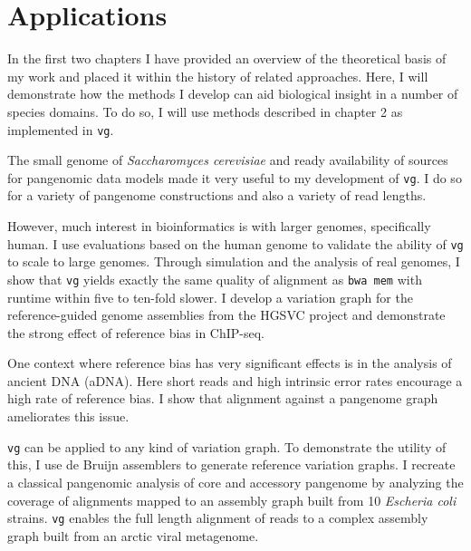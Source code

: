 \chapter{Applications}

\ifpdf
    \graphicspath{{Chapter3/Figs/Raster/}{Chapter3/Figs/PDF/}{Chapter3/Figs/}}
\else
    \graphicspath{{Chapter3/Figs/Vector/}{Chapter3/Figs/}}
\fi

In the first two chapters I have provided an overview of the theoretical basis of my work and placed it within the history of related approaches.
Here, I will demonstrate how the methods I develop can aid biological insight in a number of species domains.
To do so, I will use methods described in chapter 2 as implemented in {\tt vg}.

The small genome of \emph{Saccharomyces cerevisiae} and ready availability of sources for pangenomic data models made it very useful to my development of {\tt vg}.
I do so for a variety of pangenome constructions and also a variety of read lengths.

However, much interest in bioinformatics is with larger genomes, specifically human.
I use evaluations based on the human genome to validate the ability of {\tt vg} to scale to large genomes.
Through simulation and the analysis of real genomes, I show that {\tt vg} yields exactly the same quality of alignment as {\tt bwa mem} with runtime within five to ten-fold slower.
I develop a variation graph for the reference-guided genome assemblies from the HGSVC project and demonstrate the strong effect of reference bias in ChIP-seq.

One context where reference bias has very significant effects is in the analysis of ancient DNA (aDNA).
Here short reads and high intrinsic error rates encourage a high rate of reference bias.
I show that alignment against a pangenome graph ameliorates this issue.

{\tt vg} can be applied to any kind of variation graph.
To demonstrate the utility of this, I use de Bruijn assemblers to generate reference variation graphs.
I recreate a classical pangenomic analysis of core and accessory pangenome by analyzing the coverage of alignments mapped to an assembly graph built from 10 \emph{Escheria coli} strains.
{\tt vg} enables the full length alignment of reads to a complex assembly graph built from an arctic viral metagenome.

